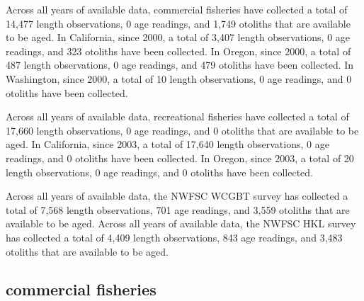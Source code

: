 \documentclass[11pt,
  english,
  letterpaper,
]{article}
\begin{document}
Across all years of available data, commercial fisheries have collected a total of 14,477 length observations, 0 age readings, and 1,749 otoliths that are available to be aged. In California, since 2000, a total of 3,407 length observations, 0 age readings, and 323 otoliths have been collected. In Oregon, since 2000, a total of 487 length observations, 0 age readings, and 479 otoliths have been collected. In Washington, since 2000, a total of 10 length observations, 0 age readings, and 0 otoliths have been collected.

\leavevmode\tagmcend\tagstructend\par


Across all years of available data, recreational fisheries have collected a total of 17,660 length observations, 0 age readings, and 0 otoliths that are available to be aged. In California, since 2003, a total of 17,640 length observations, 0 age readings, and 0 otoliths have been collected. In Oregon, since 2003, a total of 20 length observations, 0 age readings, and 0 otoliths have been collected.

\leavevmode\tagmcend\tagstructend\par


Across all years of available data, the NWFSC WCGBT survey has collected a total of 7,568 length observations, 701 age readings, and 3,559 otoliths that are available to be aged. Across all years of available data, the NWFSC HKL survey has collected a total of 4,409 length observations, 843 age readings, and 3,483 otoliths that are available to be aged.

\leavevmode\tagmcend\tagstructend\par


\hypertarget{commercial-fisheries-24}{%
\subsection{commercial fisheries}\label{commercial-fisheries-24}}

\leavevmode\tagmcend\tagstructend


\begingroup\fontsize{10}{12}\selectfont \begingroup\fontsize{10}{12}\selectfont

\leavevmode\tagmcend\tagstructend\par
\end{document}
